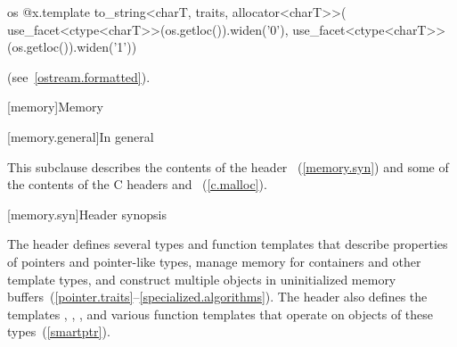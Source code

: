 \begin{itemdescr}
\pnum
\returns
\begin{codeblock}
os @\shl@ x.template to_string<charT, traits, allocator<charT>>(
  use_facet<ctype<charT>>(os.getloc()).widen('0'),
  use_facet<ctype<charT>>(os.getloc()).widen('1'))
\end{codeblock}
(see~\ref{ostream.formatted}).
\end{itemdescr}

[memory]{Memory}

[memory.general]{In general}

\pnum
This subclause describes the contents of the header
~(\ref{memory.syn}) and some
of the contents of the C headers  and
~(\ref{c.malloc}).

[memory.syn]{Header  synopsis}

\pnum
The header  defines several types and function templates that
describe properties of pointers and pointer-like types, manage memory
for containers and other template types, and construct multiple objects in
uninitialized memory
buffers~(\ref{pointer.traits}--\ref{specialized.algorithms}).
The header also defines the templates
, , , and various function
templates that operate on objects of these types~(\ref{smartptr}).

